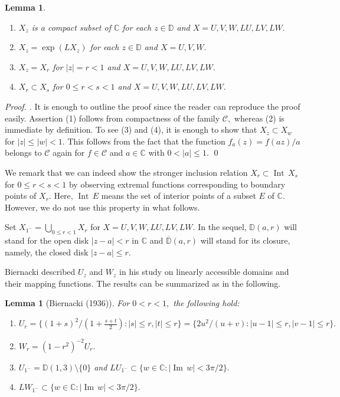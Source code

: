 \documentclass[a4paper,12pt]{amsart}
\numberwithin{equation}{section}
\newtheorem{lem}[thm]{Lemma}
\theoremstyle{definition}
\newenvironment{pf}[1][]{ \vskip 3mm
 \noindent
 \ifthenelse{\equal{#1}{}}  {{\slshape Proof. }}  {{\slshape #1.} } }{\qed\bigskip}
\begin{document}
\begin{lem}\label{lem:X}
\hspace{3mm}
\begin{enumerate}
\item
$X_z$ is a compact subset of ${{\mathbb C}}$ for each $z\in{{\mathbb D}}$ and
$X=U, V, W, LU, LV, LW.$
\item
$X_z=\exp(LX_z)$ for each $z\in{{\mathbb D}}$ and $X=U, V, W.$
\item
$X_z=X_r$ for $|z|=r<1$ and $X=U, V, W, LU, LV, LW.$
\item
$X_r\subset X_s$ for $0\le r<s<1$ and
$X=U, V, W, LU, LV, LW.$
\end{enumerate}
\end{lem}

\begin{pf}
It is enough to outline the proof since the reader can reproduce the
proof easily.
Assertion (1) follows from compactness of the family ${{\mathcal C}},$
whereas (2) is immediate by definition.
To see (3) and (4), it is enough to show that
$X_z\subset X_w$ for $|z|\le |w|<1.$
This follows from the fact that
the function $f_a(z)=f(az)/a$ belongs to ${{\mathcal C}}$ again
for $f\in{{\mathcal C}}$ and $a\in{{\mathbb C}}$ with $0<|a|\le 1.$
\end{pf}

We remark that we can indeed show the stronger inclusion relation
$X_r\subset{{\operatorname{Int}\,}} X_s$ for $0\le r<s<1$ by observing extremal functions
corresponding to boundary points of $X_r.$
Here, ${{\operatorname{Int}\,}} E$ means the set of interior points of a subset $E$ of ${{\mathbb C}}.$
However, we do not use this property in what follows.

Set $X_{1^-}=\bigcup_{0\le r<1} X_r$ for $X=U, V, W, LU, LV, LW.$
In the sequel, ${{\mathbb D}}(a,r)$ will stand for the open disk $|z-a|<r$ in ${{\mathbb C}}$
and ${{\overline{\mathbb D}}}(a,r)$ will stand for its closure, namely, the closed disk
$|z-a|\le r.$

Biernacki \cite{Bier36} described $U_z$ and $W_z$ in his study
on linearly accessible domains and their mapping functions.
The results can be summarized as in the following.

\begin{lem}[Biernacki (1936)]\label{lem:bier}
For $0<r<1,$ the following hold:
\begin{enumerate}
\item
$U_r=\{(1+s)^2/(1+\tfrac{s+t}2): |s|\le r, |t|\le r\}
=\{2u^2/(u+v): |u-1|\le r, |v-1|\le r\}.$
\item
$W_r=(1-r^2)^{-2}U_r.$
\item\label{item:U1}
$U_{1^-}={{\mathbb D}}(1,3)\setminus\{0\}$ and
$LU_{1^-}\subset\{w\in{{\mathbb C}}: |{{\operatorname{Im}\,}} w|<3\pi/2\}.$
\item
$LW_{1^-}\subset\{w\in{{\mathbb C}}: |{{\operatorname{Im}\,}} w|<3\pi/2\}.$
\end{enumerate}
\end{lem}
\end{document}
